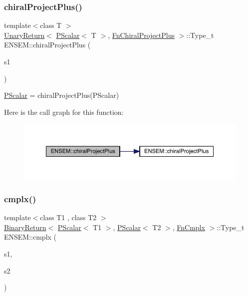 \subsubsection{\texorpdfstring{chiralProjectPlus()}{chiralProjectPlus()}}
{\footnotesize\ttfamily template$<$class T $>$ \\
\mbox{\hyperlink{structENSEM_1_1UnaryReturn}{Unary\+Return}}$<$ \mbox{\hyperlink{classENSEM_1_1PScalar}{P\+Scalar}}$<$ T $>$, \mbox{\hyperlink{structENSEM_1_1FnChiralProjectPlus}{Fn\+Chiral\+Project\+Plus}} $>$\+::Type\+\_\+t E\+N\+S\+E\+M\+::chiral\+Project\+Plus (\begin{DoxyParamCaption}\item[{const \mbox{\hyperlink{classENSEM_1_1PScalar}{P\+Scalar}}$<$ T $>$ \&}]{s1 }\end{DoxyParamCaption})\hspace{0.3cm}{\ttfamily [inline]}}



\mbox{\hyperlink{classENSEM_1_1PScalar}{P\+Scalar}} = chiral\+Project\+Plus(\+P\+Scalar) 

Here is the call graph for this function\+:\nopagebreak
\begin{figure}[H]
\begin{center}
\leavevmode
\includegraphics[width=350pt]{db/dcc/group__primscalar_ga5c2866755d31c5ec528c5763aa16a833_cgraph}
\end{center}
\end{figure}
\mbox{\label{group__primscalar_ga72cf1623c0ae655c15db12ad096194dc}} 
\subsubsection{\texorpdfstring{cmplx()}{cmplx()}}
{\footnotesize\ttfamily template$<$class T1 , class T2 $>$ \\
\mbox{\hyperlink{structENSEM_1_1BinaryReturn}{Binary\+Return}}$<$ \mbox{\hyperlink{classENSEM_1_1PScalar}{P\+Scalar}}$<$ T1 $>$, \mbox{\hyperlink{classENSEM_1_1PScalar}{P\+Scalar}}$<$ T2 $>$, \mbox{\hyperlink{structENSEM_1_1FnCmplx}{Fn\+Cmplx}} $>$\+::Type\+\_\+t E\+N\+S\+E\+M\+::cmplx (\begin{DoxyParamCaption}\item[{const \mbox{\hyperlink{classENSEM_1_1PScalar}{P\+Scalar}}$<$ T1 $>$ \&}]{s1,  }\item[{const \mbox{\hyperlink{classENSEM_1_1PScalar}{P\+Scalar}}$<$ T2 $>$ \&}]{s2 }\end{DoxyParamCaption})\hspace{0.3cm}{\ttfamily [inline]}}



